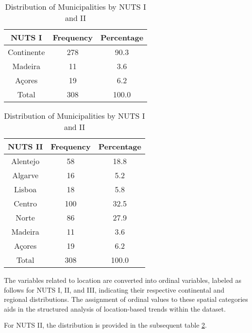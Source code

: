 \documentclass{aip-cp}
\begin{document}
\begin{table}[h!]
\parbox{.45\linewidth}{
\centering
\begin{tabular}{ccc}
\hline
\textbf{NUTS I} & \textbf{Frequency} & \textbf{Percentage} \\ 
\hline
Continente & 278 & 90.3 \\
Madeira & 11 & 3.6 \\
A\c{c}ores & 19 & 6.2\\
\hline
Total & 308 & 100.0 \\ 
\hline
\end{tabular}
\caption{Distribution of Municipalities by NUTS I and II}
\label{tab:NUTSII}
}
\hfill
\parbox{.45\linewidth}{
\centering
\begin{tabular}{ccc}
\hline
NUTS II & Frequency & Percentage \\ 
\hline
Alentejo & 58 & 18.8 \\
Algarve & 16 & 5.2 \\
Lisboa & 18 & 5.8 \\
Centro & 100 & 32.5 \\
Norte & 86 & 27.9 \\
Madeira & 11 & 3.6 \\
A\c{c}ores  & 19 & 6.2 \\
\hline
Total & 308 & 100.0 \\
\hline
\end{tabular}
}
\end{table}


The variables related to location are converted into ordinal variables, labeled as follows for NUTS I, II, and III, indicating their respective continental and regional distributions. The assignment of ordinal values to these spatial categories aids in the structured analysis of location-based trends within the dataset.

For NUTS II, the distribution is provided in the subsequent table \ref{tab:NUTSII}.
\end{document}
